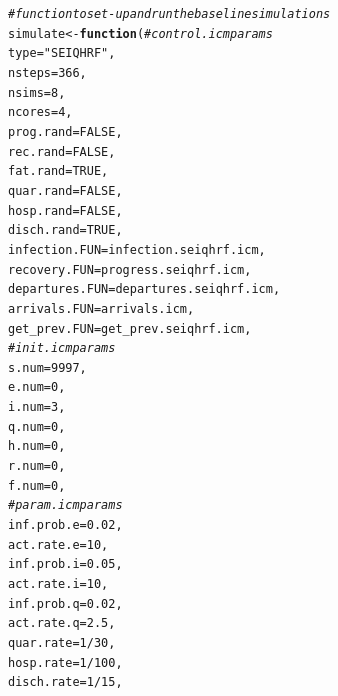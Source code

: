 \documentclass{article}\usepackage[]{graphicx}\usepackage[]{color}
\makeatletter
\newcommand{\hlnum}[1]{\textcolor[rgb]{0.686,0.059,0.569}{#1}}%
\newcommand{\hlstr}[1]{\textcolor[rgb]{0.192,0.494,0.8}{#1}}%
\newcommand{\hlcom}[1]{\textcolor[rgb]{0.678,0.584,0.686}{\textit{#1}}}%
\newcommand{\hlopt}[1]{\textcolor[rgb]{0,0,0}{#1}}%
\newcommand{\hlstd}[1]{\textcolor[rgb]{0.345,0.345,0.345}{#1}}%
\newcommand{\hlkwa}[1]{\textcolor[rgb]{0.161,0.373,0.58}{\textbf{#1}}}%
\newcommand{\hlkwb}[1]{\textcolor[rgb]{0.69,0.353,0.396}{#1}}%
\newcommand{\hlkwc}[1]{\textcolor[rgb]{0.333,0.667,0.333}{#1}}%
\newenvironment{kframe}{%
 \def\at@end@of@kframe{}%
 \ifinner\ifhmode%
  \def\at@end@of@kframe{\end{minipage}}%
  \begin{minipage}{\columnwidth}%
 \fi\fi%
 \def\FrameCommand##1{\hskip\@totalleftmargin \hskip-\fboxsep
 \colorbox{shadecolor}{##1}\hskip-\fboxsep
     \hskip-\linewidth \hskip-\@totalleftmargin \hskip\columnwidth}%
 \MakeFramed {\advance\hsize-\width
   \@totalleftmargin\z@ \linewidth\hsize
   \@setminipage}}%
 {\par\unskip\endMakeFramed%
 \at@end@of@kframe}
\newenvironment{knitrout}{}{} %
\makeatother
\begin{document}
\begin{knitrout}
\color{fgcolor}\begin{kframe}
\begin{alltt}
\hlcom{# function to set-up and run the baseline simulations}
\hlstd{simulate} \hlkwb{<-} \hlkwa{function}\hlstd{(}\hlcom{# control.icm params}
                     \hlkwc{type} \hlstd{=} \hlstr{"SEIQHRF"}\hlstd{,}
                     \hlkwc{nsteps} \hlstd{=} \hlnum{366}\hlstd{,}
                     \hlkwc{nsims} \hlstd{=} \hlnum{8}\hlstd{,}
                     \hlkwc{ncores} \hlstd{=} \hlnum{4}\hlstd{,}
                     \hlkwc{prog.rand} \hlstd{=} \hlnum{FALSE}\hlstd{,}
                     \hlkwc{rec.rand} \hlstd{=} \hlnum{FALSE}\hlstd{,}
                     \hlkwc{fat.rand} \hlstd{=} \hlnum{TRUE}\hlstd{,}
                     \hlkwc{quar.rand} \hlstd{=} \hlnum{FALSE}\hlstd{,}
                     \hlkwc{hosp.rand} \hlstd{=} \hlnum{FALSE}\hlstd{,}
                     \hlkwc{disch.rand} \hlstd{=} \hlnum{TRUE}\hlstd{,}
                     \hlkwc{infection.FUN} \hlstd{= infection.seiqhrf.icm,}
                     \hlkwc{recovery.FUN} \hlstd{= progress.seiqhrf.icm,}
                     \hlkwc{departures.FUN} \hlstd{= departures.seiqhrf.icm,}
                     \hlkwc{arrivals.FUN} \hlstd{= arrivals.icm,}
                     \hlkwc{get_prev.FUN} \hlstd{= get_prev.seiqhrf.icm,}
                     \hlcom{# init.icm params}
                     \hlkwc{s.num} \hlstd{=} \hlnum{9997}\hlstd{,}
                     \hlkwc{e.num}\hlstd{=}\hlnum{0}\hlstd{,}
                     \hlkwc{i.num} \hlstd{=} \hlnum{3}\hlstd{,}
                     \hlkwc{q.num}\hlstd{=}\hlnum{0}\hlstd{,}
                     \hlkwc{h.num}\hlstd{=}\hlnum{0}\hlstd{,}
                     \hlkwc{r.num} \hlstd{=} \hlnum{0}\hlstd{,}
                     \hlkwc{f.num} \hlstd{=} \hlnum{0}\hlstd{,}
                     \hlcom{# param.icm params}
                     \hlkwc{inf.prob.e} \hlstd{=} \hlnum{0.02}\hlstd{,}
                     \hlkwc{act.rate.e} \hlstd{=} \hlnum{10}\hlstd{,}
                     \hlkwc{inf.prob.i} \hlstd{=} \hlnum{0.05}\hlstd{,}
                     \hlkwc{act.rate.i} \hlstd{=} \hlnum{10}\hlstd{,}
                     \hlkwc{inf.prob.q} \hlstd{=} \hlnum{0.02}\hlstd{,}
                     \hlkwc{act.rate.q} \hlstd{=} \hlnum{2.5}\hlstd{,}
                     \hlkwc{quar.rate} \hlstd{=} \hlnum{1}\hlopt{/}\hlnum{30}\hlstd{,}
                     \hlkwc{hosp.rate} \hlstd{=} \hlnum{1}\hlopt{/}\hlnum{100}\hlstd{,}
                     \hlkwc{disch.rate} \hlstd{=} \hlnum{1}\hlopt{/}\hlnum{15}\hlstd{,}

\end{alltt}
\end{kframe}
\end{knitrout}
\end{document}

